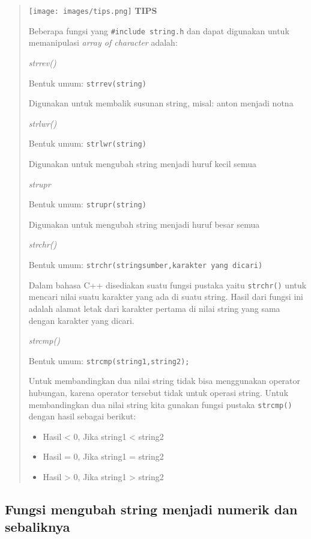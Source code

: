 \begin{quotation}
\texttt{[image: images/tips.png]}	\textbf{TIPS}
	
	Beberapa fungsi yang \texttt{\#include\ string.h} dan dapat digunakan
	untuk memanipulasi \emph{array of character} adalah:
	
	\emph{strrev()}
	
	Bentuk umum: \texttt{strrev(string)}
	
	Digunakan untuk membalik susunan string, misal: anton menjadi notna
	
	\emph{strlwr()}
	
	Bentuk umum: \texttt{strlwr(string)}
	
	Digunakan untuk mengubah string menjadi huruf kecil semua
	
	\emph{strupr}
	
	Bentuk umum: \texttt{strupr(string)}
	
	Digunakan untuk mengubah string menjadi huruf besar semua
	
	\emph{strchr()}
	
	Bentuk umum: \texttt{strchr(stringsumber,karakter\ yang\ dicari)}
	
	Dalam bahasa C++ disediakan suatu fungsi pustaka yaitu \texttt{strchr()}
	untuk mencari nilai suatu karakter yang ada di suatu string. Hasil dari
	fungsi ini adalah alamat letak dari karakter pertama di nilai string
	yang sama dengan karakter yang dicari.
	
	\emph{strcmp()}
	
	Bentuk umum: \texttt{strcmp(string1,string2);}
	
	Untuk membandingkan dua nilai string tidak bisa menggunakan operator
	hubungan, karena operator tersebut tidak untuk operasi string. Untuk
	membandingkan dua nilai string kita gunakan fungsi pustaka
	\texttt{strcmp()} dengan hasil sebagai berikut:
	
	\begin{itemize}
		
		\item
		Hasil \textless{} 0, Jika string1 \textless{} string2
		\item
		Hasil = 0, Jika string1 = string2
		\item
		Hasil \textgreater{} 0, Jika string1 \textgreater{} string2
	\end{itemize}
\end{quotation}


\subsection{Fungsi mengubah string menjadi numerik dan
sebaliknya}\label{fungsi-mengubah-string-menjadi-numerik-dan-sebaliknya}

